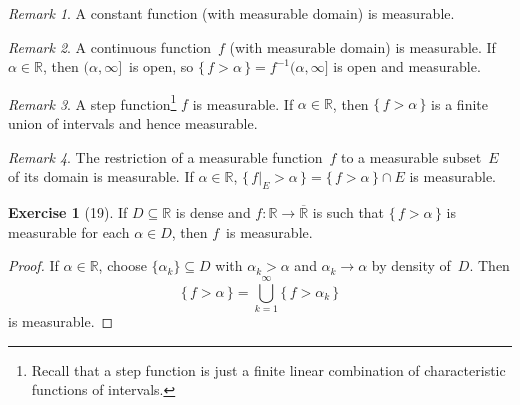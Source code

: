 \documentclass[letterpaper,12pt]{article}
\newcommand{\R}{\mathbb{R}}
\newcommand{\Rex}{\overline{\R}}
\newcommand{\sect}{\cap}
\newcommand{\bigunion}{\bigcup}
\newcommand{\res}[2]{{#1}|_{#2}}
\theoremstyle{plain}
\theoremstyle{definition}
\newtheorem*{exer}{Exercise}
\theoremstyle{remark}
\newtheorem*{rmk}{Remark}
\begin{document}
\begin{rmk}
A constant function (with measurable domain) is measurable.
\end{rmk}

\begin{rmk}
A continuous function~\(f\) (with measurable domain) is measurable. If \(\alpha\in\R\), then \((\alpha,\infty]\)~is open, so \(\{\,f>\alpha\,\}=f^{-1}(\alpha,\infty]\) is open and measurable.
\end{rmk}

\begin{rmk}
A step function\footnote{Recall that a step function is just a finite linear combination of characteristic functions of intervals.} \(f\) is measurable. If \(\alpha\in\R\), then \(\{\,f>\alpha\,\}\) is a finite union of intervals and hence measurable.
\end{rmk}

\begin{rmk}
The restriction of a measurable function~\(f\) to a measurable subset~\(E\) of its domain is measurable. If \(\alpha\in\R\), \(\{\,\res{f}{E}>\alpha\,\}=\{\,f>\alpha\,\}\sect E\) is measurable.
\end{rmk}

\begin{exer}[19]
If \(D\subseteq\R\) is dense and \(f:\R\to\Rex\) is such that \(\{\,f>\alpha\,\}\) is measurable for each \(\alpha\in D\), then \(f\)~is measurable.
\end{exer}
\begin{proof}
If \(\alpha\in\R\), choose \(\{\alpha_k\}\subseteq D\) with \(\alpha_k>\alpha\) and \(\alpha_k\to\alpha\) by density of~\(D\). Then
\[\{\,f>\alpha\,\}=\bigunion_{k=1}^{\infty}\{\,f>\alpha_k\,\}\]
is measurable.
\end{proof}
\end{document}
